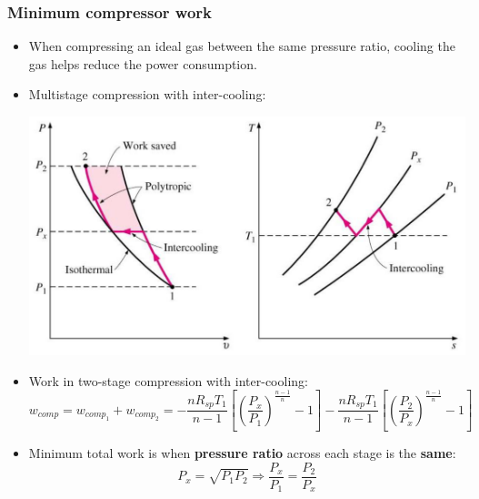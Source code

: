 \documentclass[11pt]{article}
\begin{document}
\subsubsection{Minimum compressor work}
\label{sec:org2bfaff9}
\begin{itemize}
\item When compressing an ideal gas between the same pressure ratio, cooling the gas helps reduce the power consumption.
\item Multistage compression with inter-cooling:
\begin{center}
\includegraphics[width=.9\linewidth]{./images/multistage-compression-with-inter-cooling.png}
\end{center}
\item Work in two-stage compression with inter-cooling:
\[w_{comp} = w_{comp_1} + w_{comp_2} = - \frac{n R_{sp} T_1}{n - 1} \left[\left(\frac{P_x}{P_1} \right)^{\frac{n - 1}{n}} - 1 \right] - \frac{n R_{sp} T_1}{n - 1} \left[\left(\frac{P_2}{P_x} \right)^{\frac{n - 1}{n}} - 1 \right]\]
\item Minimum total work is when \textbf{pressure ratio} across each stage is the \textbf{same}:
\[P_x = \sqrt{P_1 P_2} \Rightarrow \frac{P_x}{P_1} = \frac{P_2}{P_x}\]
\end{itemize}

 \newpage
\end{document}
